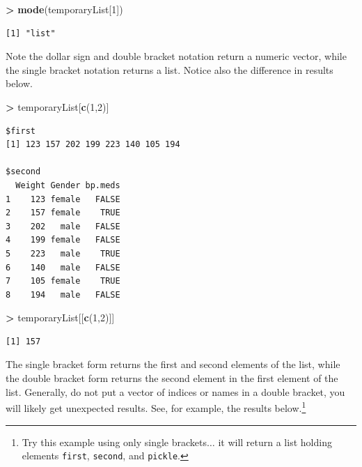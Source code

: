\documentclass[]{krantz}
\makeatletter
\newenvironment{Shaded}{\begin{snugshade}}{\end{snugshade}}
\newcommand{\KeywordTok}[1]{\textcolor[rgb]{0.27,0.27,0.27}{\textbf{#1}}}
\newcommand{\DecValTok}[1]{\textcolor[rgb]{0.06,0.06,0.06}{#1}}
\newcommand{\StringTok}[1]{\textcolor[rgb]{0.5,0.5,0.5}{#1}}
\newcommand{\OperatorTok}[1]{\textcolor[rgb]{0.43,0.43,0.43}{\textbf{#1}}}
\newcommand{\NormalTok}[1]{#1}
\newenvironment{kframe}{%
\medskip{}
\setlength{\fboxsep}{.8em}
 \def\at@end@of@kframe{}%
 \ifinner\ifhmode%
  \def\at@end@of@kframe{\end{minipage}}%
  \begin{minipage}{\columnwidth}%
 \fi\fi%
 \def\FrameCommand##1{\hskip\@totalleftmargin \hskip-\fboxsep
 \colorbox{shadecolor}{##1}\hskip-\fboxsep
     \hskip-\linewidth \hskip-\@totalleftmargin \hskip\columnwidth}%
 \MakeFramed {\advance\hsize-\width
   \@totalleftmargin\z@ \linewidth\hsize
   \@setminipage}}%
 {\par\unskip\endMakeFramed%
 \at@end@of@kframe}
\renewenvironment{Shaded}{\begin{kframe}}{\end{kframe}}
\makeatother
\begin{document}
\begin{Shaded}
\begin{Highlighting}[]
\OperatorTok{>}\StringTok{ }\KeywordTok{mode}\NormalTok{(temporaryList[}\DecValTok{1}\NormalTok{])}
\end{Highlighting}
\end{Shaded}

\begin{verbatim}
[1] "list"
\end{verbatim}

Note the dollar sign and double bracket notation return a numeric
vector, while the single bracket notation returns a list. Notice also
the difference in results below.

\begin{Shaded}
\begin{Highlighting}[]
\OperatorTok{>}\StringTok{ }\NormalTok{temporaryList[}\KeywordTok{c}\NormalTok{(}\DecValTok{1}\NormalTok{,}\DecValTok{2}\NormalTok{)]}
\end{Highlighting}
\end{Shaded}

\begin{verbatim}
$first
[1] 123 157 202 199 223 140 105 194

$second
  Weight Gender bp.meds
1    123 female   FALSE
2    157 female    TRUE
3    202   male   FALSE
4    199 female   FALSE
5    223   male    TRUE
6    140   male   FALSE
7    105 female    TRUE
8    194   male   FALSE
\end{verbatim}

\begin{Shaded}
\begin{Highlighting}[]
\OperatorTok{>}\StringTok{ }\NormalTok{temporaryList[[}\KeywordTok{c}\NormalTok{(}\DecValTok{1}\NormalTok{,}\DecValTok{2}\NormalTok{)]]}
\end{Highlighting}
\end{Shaded}

\begin{verbatim}
[1] 157
\end{verbatim}

The single bracket form returns the first and second elements of the
list, while the double bracket form returns the second element in the
first element of the list. Generally, do not put a vector of indices or
names in a double bracket, you will likely get unexpected results. See,
for example, the results below.\footnote{Try this example using only
  single brackets\(\ldots\) it will return a list holding elements
  \texttt{first}, \texttt{second}, and \texttt{pickle}.}
\end{document}
